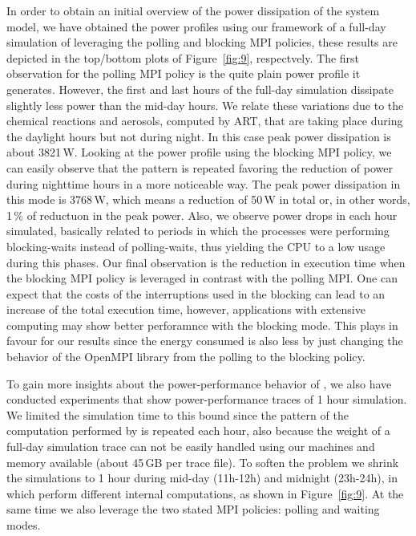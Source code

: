 In order to obtain an initial overview of the power dissipation of the system model, we have 
obtained the power profiles using our \pmlib framework of a full-day simulation of \cosmoart 
leveraging the polling and blocking MPI policies, these results are depicted in the top/bottom 
plots of Figure~\ref{fig:9}, respectvely. The first observation for 
the polling MPI policy is the quite plain power profile it generates. However, the first and 
last hours of the full-day simulation dissipate slightly less power than the mid-day hours. We 
relate these variations due to the chemical reactions and aerosols, computed by ART, that are 
taking place during the daylight hours but not during night. In this case peak power 
dissipation is about 3821\,W. Looking at the power profile using the blocking MPI policy, we 
can easily observe that the pattern is repeated favoring the reduction of power during 
nighttime hours in a more  noticeable way. The peak power dissipation in this mode is 3768\,W, 
which means a reduction of 50\,W in total or, in other words, 1\,\% of reductuon in the peak 
power. Also, we observe power  drops in each hour simulated, basically related to periods in 
which the processes were performing blocking-waits instead of polling-waits, thus yielding the 
CPU to a low usage during this phases. Our final observation is the reduction in execution time 
when the blocking MPI policy is leveraged in contrast with the polling MPI. One can expect that 
the costs of the interruptions used in the blocking can lead to an increase of the total 
execution time, however, applications with extensive computing may show better perforamnce with 
the blocking mode. This plays in favour for our results since the energy consumed is also less 
by just changing the behavior of the OpenMPI library from the polling to the blocking policy.

To gain more insights about the power-performance behavior of \cosmoart, we also have conducted 
experiments that show power-performance traces of 1 hour simulation. We limited the simulation 
time to this bound since the pattern of the computation performed by \cosmoart is repeated each 
hour, also because the weight of a full-day simulation trace can not be easily handled using 
our machines and memory available (about 45\,GB per trace file). To soften the problem we 
shrink the simulations to 1 hour during mid-day (11h-12h) and midnight (23h-24h), in which 
\cosmoart perform different internal computations, as shown in Figure~\ref{fig:9}. At the same
time we also leverage the two stated MPI policies: polling and waiting modes.

